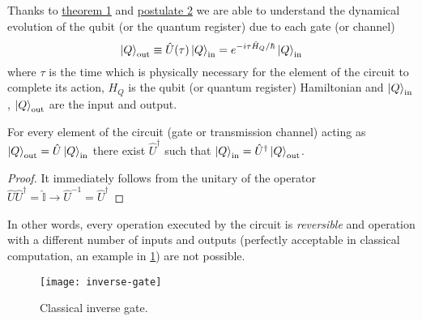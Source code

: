 Thanks to \hyperref[theorem:1]{theorem 1} and \hyperref[postulate:2]{postulate 2} we are able to understand the dynamical evolution of the qubit (or the quantum register) due to each gate (or channel) 
\begin{equation}\label{eq:evolution}
     \ket{Q}_\textup{out} \equiv \hat{U}(\tau) \ket{Q}_\textup{in} = e^{-i\tau\hat{H}_Q/\hbar} \ket{Q}_\textup{in}
\end{equation}
where $\tau$ is the time which is physically necessary for the element of the circuit to complete its action, $H_Q$ is the qubit (or quantum register) Hamiltonian and $\ket{Q}_\textup{in}$, $\ket{Q}_\textup{out}$ are the input and output.
\begin{theorem}
For every element of the circuit (gate or transmission channel) acting as $\ket{Q}_\textup{out} = \hat{U} \ket{Q}_\textup{in}$ there exist $\hat{U}^\dagger$ such that $\ket{Q}_\textup{in} = \hat{U}^\dagger \ket{Q}_\textup{out}$.
\end{theorem}
\begin{proof}
It immediately follows from the unitary of the operator $\hat{U} \hat{U}^\dagger = \hat{\mathbb{I}} \rightarrow \hat{U}^{-1} = \hat{U}^\dagger$
\end{proof}
In other words, every operation executed by the circuit is \emph{reversible} and operation with a different number of inputs and outputs (perfectly acceptable in classical computation, an example in \ref{fig:classical-inverse-gate}) are not possible.
\begin{figure}[htb]
\centering
\texttt{[image: inverse-gate]}
\caption{Classical inverse gate.}
\label{fig:classical-inverse-gate}
\end{figure}
